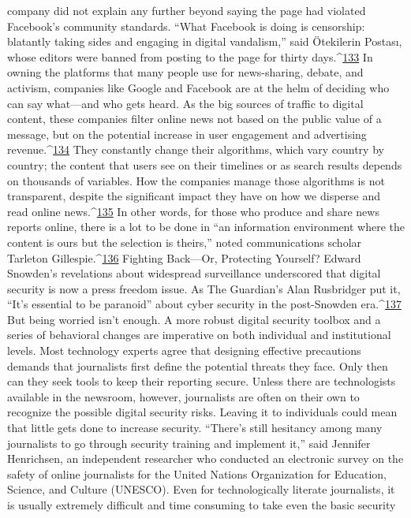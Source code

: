 company did not explain any further beyond saying the page had violated Facebook’s
community standards. ``What Facebook is doing is censorship: blatantly taking sides and
engaging in digital vandalism,'' said Ötekilerin Postası, whose editors were banned from
posting to the page for thirty days.^{\href{#endnotes}{133}}
In owning the platforms that many people use for news-sharing, debate, and activism,
companies like Google and Facebook are at the helm of deciding who can say what—and
who gets heard. As the big sources of traffic to digital content, these companies filter
online news not based on the public value of a message, but on the potential increase in
user engagement and advertising revenue.^{\href{#endnotes}{134}} They constantly change their algorithms,
which vary country by country; the content that users see on their timelines or as search
results depends on thousands of variables. How the companies manage those algorithms
is not transparent, despite the significant impact they have on how we disperse and read
online news.^{\href{#endnotes}{135}}
In other words, for those who produce and share news reports online, there is a lot to be
done in ``an information environment where the content is ours but the selection is
theirs,'' noted communications scholar Tarleton Gillespie.^{\href{#endnotes}{136}}
Fighting Back—Or, Protecting Yourself?
Edward Snowden’s revelations about widespread surveillance underscored that digital
security is now a press freedom issue. As The Guardian’s Alan Rusbridger put it, ``It’s
essential to be paranoid'' about cyber security in the post-Snowden era.^{\href{#endnotes}{137}} But being
worried isn’t enough. A more robust digital security toolbox and a series of behavioral
changes are imperative on both individual and institutional levels.
Most technology experts agree that designing effective precautions demands that
journalists first define the potential threats they face. Only then can they seek tools to
keep their reporting secure. Unless there are technologists available in the newsroom,
however, journalists are often on their own to recognize the possible digital security risks.
Leaving it to individuals could mean that little gets done to increase security. ``There’s
still hesitancy among many journalists to go through security training and implement it,''
said Jennifer Henrichsen, an independent researcher who conducted an electronic survey
on the safety of online journalists for the United Nations Organization for Education,
Science, and Culture (UNESCO). Even for technologically literate journalists, it is
usually extremely difficult and time consuming to take even the basic security
